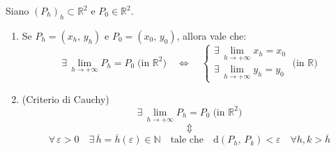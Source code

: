\begin{thm}
Siano $(P_h)_h \subset \mathbb{R}^2$ e $P_0 \in \mathbb{R}^2$.
\begin{enumerate}[labelindent=\parindent,leftmargin=*,label=\textnormal{(\roman*)},start=1]
\item Se $P_h=(x_h,\, y_h)$ e $P_0=(x_0,\, y_0)$, allora vale che:
$$\exists \, \lim_{h \rightarrow +\infty} P_h = P_0 \; \text{(in } \mathbb{R}^2\text{)} \quad \Longleftrightarrow \quad 
\begin{cases}
\exists \, \lim_{h \rightarrow +\infty} x_h = x_0\\
\exists \, \lim_{h \rightarrow +\infty} y_h = y_0
\end{cases}
 \; \text{(in } \mathbb{R}\text{)}$$
\item (Criterio di Cauchy)
$$\exists \, \lim_{h \rightarrow +\infty} P_h = P_0 \; \text{(in } \mathbb{R}^2\text{)}$$
$$\Updownarrow$$
$$\forall \, \varepsilon > 0 \quad \exists \, \overline{h}=\overline{h}(\varepsilon) \in \mathbb{N} \quad \text{tale che} \quad \mathrm{d}(P_h,\, P_k) < \varepsilon \quad \forall h,k > \overline{h}$$
\end{enumerate}
\end{thm}
